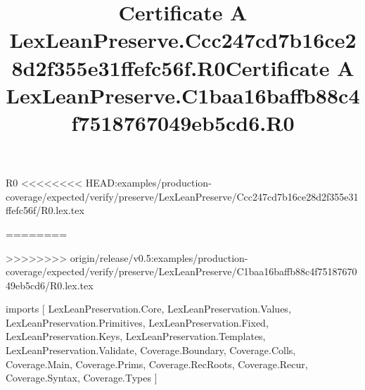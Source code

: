 \begin{lexlean}{R0}
<<<<<<<< HEAD:examples/production-coverage/expected/verify/preserve/LexLeanPreserve/Ccc247cd7b16ce28d2f355e31ffefc56f/R0.lex.tex
\title{Certificate A LexLeanPreserve.Ccc247cd7b16ce28d2f355e31ffefc56f.R0}
========
\title{Certificate A LexLeanPreserve.C1baa16baffb88c4f7518767049eb5cd6.R0}
>>>>>>>> origin/release/v0.5:examples/production-coverage/expected/verify/preserve/LexLeanPreserve/C1baa16baffb88c4f7518767049eb5cd6/R0.lex.tex
\begin{coremodule}
imports [
  LexLeanPreservation.Core,
  LexLeanPreservation.Values,
  LexLeanPreservation.Primitives,
  LexLeanPreservation.Fixed,
  LexLeanPreservation.Keys,
  LexLeanPreservation.Templates,
  LexLeanPreservation.Validate,
  Coverage.Boundary,
  Coverage.Colls,
  Coverage.Main,
  Coverage.Prims,
  Coverage.RecRoots,
  Coverage.Recur,
  Coverage.Syntax,
  Coverage.Types
]


\end{coremodule}
\end{lexlean}
